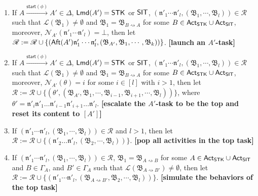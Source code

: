 \documentclass[preprint,12pt]{elsarticle}
\newcommand\act{{\sf Act}}
\newcommand\aft{{\sf Aft}}
\newcommand\lmd{{\sf Lmd}}
\newcommand\singletask{{\sf STK}}
\newcommand\singleinstance{{\sf SIT}}
\newcommand\startactivity{{\mathsf{start} }}
\newcommand\post{{\mathsf{post} }}
\newcommand\namefun{\mathcal{N}}
\newcommand\aname{\mathfrak{n}}
\newcommand\AutReach{\mathscr{R}}
\newcommand{\STK}{\mathsf{STK}}
\newcommand{\SIT}{\mathsf{SIT}}
\newcommand\AutB{{\mathfrak{B} }}
\newcommand\Lang{{\mathscr{L} }}
\begin{document}
\smallskip
\fbox
{
\begin{minipage}{0.9\textwidth}
\begin{enumerate}
    \item If $A \xrightarrow{\startactivity(\phi)}A' \in\Delta$, $\lmd(A')=\STK$ or $\singleinstance$, $(\aname'_1 \cdots \aname'_l, (\AutB_1,\cdots,\AutB_l)) \in \AutReach$ such that $\Lang(\AutB_1) \neq \emptyset$ and $\AutB_1 = \AutB_{B\rightsquigarrow A}$ for some $B \in \act_\singletask\cup\act_\singleinstance$, moreover, $\namefun_{A'}(\aname'_1 \cdots \aname'_l) = \bot$,
    then let $\AutReach: = \AutReach \cup \{(\aft(A')\aname'_1 \cdots \aname'_l, (\AutB_{A'},\AutB_1,\cdots,\AutB_k))\}$.
        \textbf{[launch an $A'$-task]}

    \item If $A \xrightarrow{\startactivity(\phi)}A' \in\Delta$, $\lmd(A')=\STK$ or $\singleinstance$, $(\aname'_1 \cdots \aname'_l, (\AutB_1,\cdots,\AutB_l)) \in \AutReach$ such that $\Lang(\AutB_1) \neq \emptyset$ and $\AutB_1 = \AutB_{B\rightsquigarrow A}$ for some $B \in \act_\singletask\cup\act_\singleinstance$, moreover, $\namefun_{A'}(\theta) = i$ for some $i \in [l]$ with $i > 1$, 
        then let $\AutReach:= \AutReach \cup \{(\theta', (\AutB_{A'}, \AutB_1, \cdots,\AutB_{i-1},\AutB_{i+1},\cdots,\AutB_{l}))\}$, where $\theta' = \aname'_i\aname'_1\dots\aname'_{i-1}\aname'_{i+1}\dots\aname'_l$. 
        \textbf{[escalate the $A'$-task to be the top and reset its content to $[A']$]}
    \item If $(\aname'_1 \cdots \aname'_l, (\AutB_1,\cdots,\AutB_l)) \in \AutReach$ and $l>1$, then let $\AutReach := \AutReach \cup \{(\aname'_2\dots\aname'_l, (\AutB_2,\cdots,\AutB_l))\}$.
        \textbf{[pop all activities in the top task]}
%
    \item If $(\aname'_1 \cdots \aname'_l, (\AutB_1,\cdots,\AutB_l)) \in \AutReach$, $\AutB_1 = \AutB_{A\rightsquigarrow B}$ for some $A\in\act_{\STK}\cup\act_{\SIT}$ and $B \in \Gamma_A$, and $B'  \in \Gamma_A$ such that $\Lang(\AutB_{A\rightsquigarrow B'}) \neq \emptyset$, then let 
    $\AutReach := \AutReach \cup \{(\aname'_1 \cdots \aname'_l, (\AutB_{A\rightsquigarrow B'}, \AutB_2,\cdots,\AutB_l))\}$. 
        \textbf{[simulate the behaviors of the top task]}
\end{enumerate}
\end{minipage}
}
\end{document}
